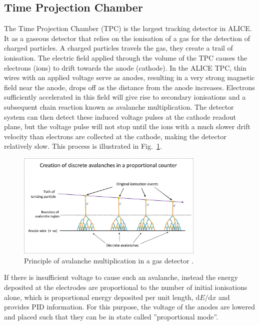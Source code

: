 \subsection{Time Projection Chamber}
\label{sec:TPC}

The Time Projection Chamber (TPC) is the largest tracking detector in ALICE. It as a gaseous detector that relies on the ionisation of a gas for the detection of charged particles. A charged particles travels the gas, they create a trail of ionisation. The electric field applied through the volume of the TPC causes the electrons (ions) to drift towards the anode (cathode). In the ALICE TPC, thin wires with an applied voltage serve as anodes, resulting in a very strong magnetic field near the anode, drops off as the distance from the anode increases. Electrons sufficiently accelerated in this field will give rise to secondary ionisations and a subsequent chain reaction known as avalanche multiplication. The detector system can then detect these induced voltage pulses at the cathode readout plane, but the voltage pulse will not stop until the ions with a much slower drift velocity than electrons are collected at the cathode, making the detector relatively slow. This process is illustrated in Fig.~\ref{fig:tpc_avalanche}.

\begin{figure}[htpb]
  \centering
  \includegraphics[width=0.8\textwidth]{Experimental_Aparatus/Proportional_counter.jpg}
  \caption{Principle of avalanche multiplication in a gas detector \cite{Dougsim2012}.}
  \label{fig:tpc_avalanche}
\end{figure}

If there is insufficient voltage to cause such an avalanche, instead the energy deposited at the electrodes are proportional to the number of initial ionisations alone, which is proportional energy deposited per unit length, $\text{d}E/\text{d}x$ and provides PID information. For this purpose, the voltage of the anodes are lowered and placed such that they can be in state called ''proportional mode''.

